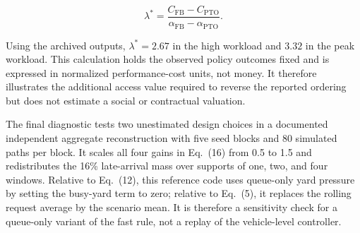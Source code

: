 \documentclass[preprint,12pt,authoryear,a4paper]{elsarticle}
\begin{document}
\[
\lambda^*
=\frac{C_{\mathrm{FB}}-C_{\mathrm{PTO}}}
{\alpha_{\mathrm{FB}}-\alpha_{\mathrm{PTO}}}.
\]

Using the archived outputs, \(\lambda^*=2.67\) in the high workload and \(3.32\) in the peak workload. This calculation holds the observed policy outcomes fixed and is expressed in normalized performance-cost units, not money. It therefore illustrates the additional access value required to reverse the reported ordering but does not estimate a social or contractual valuation.

The final diagnostic tests two unestimated design choices in a documented independent aggregate reconstruction with five seed blocks and 80 simulated paths per block. It scales all four gains in Eq.~(16) from 0.5 to 1.5 and redistributes the 16\% late-arrival mass over supports of one, two, and four windows. Relative to Eq.~(12), this reference code uses queue-only yard pressure by setting the busy-yard term to zero; relative to Eq.~(5), it replaces the rolling request average by the scenario mean. It is therefore a sensitivity check for a queue-only variant of the fast rule, not a replay of the vehicle-level controller.
\end{document}
